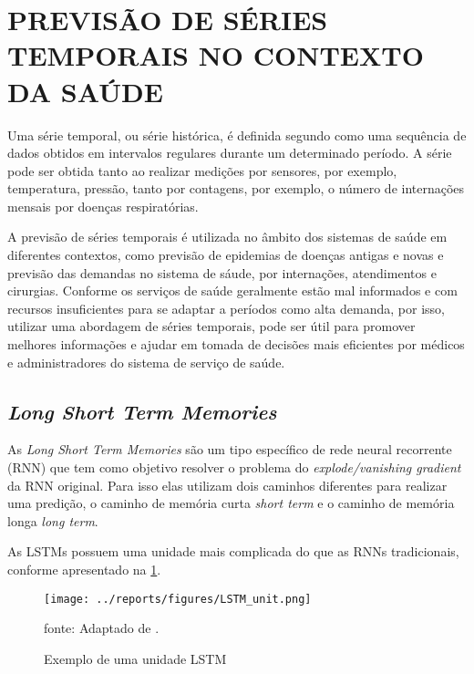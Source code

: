 \documentclass[
  12pt,		%
  a4paper,	%
  openright,%
  oneside,	%
  chapter=TITLE,		%
  section=TITLE,		%
  english,	%
  french,	%
  spanish,	%
  brazil	%
]{abntex2}
\begin{document}
    \section{PREVISÃO DE SÉRIES TEMPORAIS NO CONTEXTO DA SAÚDE}
    Uma série temporal, ou série histórica, é definida segundo \cite[]{series_temporais}
    como uma sequência de dados obtidos em intervalos regulares durante um determinado período.
    A série pode ser obtida tanto ao realizar medições por sensores, por exemplo, temperatura, pressão, 
    tanto por contagens, por exemplo, o número de internações mensais por doenças respiratórias.

    A previsão de séries temporais é utilizada no âmbito dos sistemas de saúde em diferentes contextos, como 
    previsão de epidemias de doenças antigas e novas e previsão das demandas no sistema de sáude, por internações, atendimentos e cirurgias.
    Conforme \cite[]{forcasting_health} os serviços de saúde geralmente estão mal informados 
    e com recursos insuficientes para se adaptar a períodos como alta demanda, por isso, utilizar uma abordagem
    de séries temporais, pode ser útil para promover melhores informações e ajudar em tomada de 
    decisões mais eficientes por médicos e administradores do sistema de serviço de saúde.

    \subsection{\textit{Long Short Term Memories}}
    \label{LSTM}
    As \textit{Long Short Term Memories} são um tipo específico de rede neural recorrente (RNN) que tem como objetivo
    resolver o problema do \textit{explode/vanishing gradient} da RNN original. Para isso elas utilizam dois caminhos
    diferentes para realizar uma predição, o caminho de memória curta \textit{short term} e o caminho de memória longa
    \textit{long term}.

    As LSTMs possuem uma unidade mais complicada do que as RNNs tradicionais, conforme apresentado na \ref*{lstm_unit}.
    \begin{figure}[ht]
        \centering
        \caption{Exemplo de uma unidade LSTM}
        \texttt{[image: ../reports/figures/LSTM\_unit.png]}
        \label{lstm_unit}
        \par
        {\small fonte: Adaptado de \cite[]{statquest}.}
    \end{figure}
\end{document}
